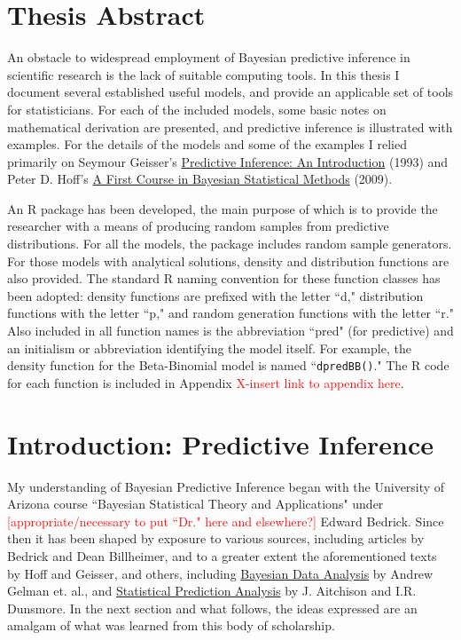 \documentclass[12pt, a4paper]{article}
\begin{document}




\tableofcontents
\newpage


\section{Thesis Abstract}

An obstacle to widespread employment of Bayesian predictive inference in scientific research is the lack of suitable computing tools.  In this thesis I document several established useful models, and provide an applicable set of tools for statisticians.  For each of the included models, some basic notes on mathematical derivation are presented, and predictive inference is illustrated with examples.  For the details of the models and some of the examples I relied primarily on Seymour Geisser's \underline{Predictive Inference:  An Introduction} (1993) and Peter D. Hoff's \underline{A First Course in Bayesian Statistical Methods} (2009).

    An R package has been developed, the main purpose of which is to provide the researcher with a means of producing random samples from predictive distributions.  For all the models, the package includes random sample generators.  For those models with analytical solutions, density and distribution functions are also provided.  The standard R naming convention for these function classes has been adopted:  density functions are prefixed with the letter ``d," distribution functions with the letter ``p," and random generation functions with the letter ``r."  Also included in all function names is the abbreviation ``pred" (for predictive) and an initialism or abbreviation identifying the model itself.  For example, the density function for the Beta-Binomial model is named ``\texttt{dpredBB()}."  The R code for each function is included in Appendix \textcolor{red}{X-insert link to appendix here}.




\section{Introduction:  Predictive Inference}

My understanding of Bayesian Predictive Inference began with the University of Arizona course ``Bayesian Statistical Theory and Applications" under \textcolor{red}{[appropriate/necessary to put ``Dr." here and elsewhere?]} Edward Bedrick.  Since then it has been shaped by exposure to various sources, including articles by Bedrick and Dean Billheimer, and to a greater extent the aforementioned texts by Hoff and Geisser, and others, including \underline{Bayesian Data Analysis} by Andrew Gelman et. al., and \underline{Statistical Prediction Analysis} by J. Aitchison and I.R. Dunsmore.  In the next section and what follows, the ideas expressed are an amalgam of what was learned from this body of scholarship.
\end{document}

